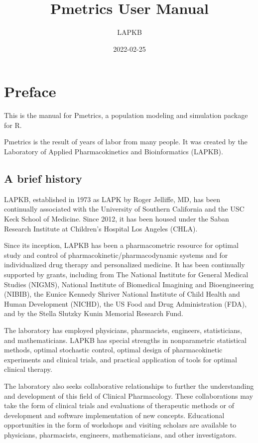 \documentclass[
]{book}
\title{Pmetrics User Manual}
\author{LAPKB}
\date{2022-02-25}
\begin{document}
\maketitle

{
\setcounter{tocdepth}{1}
\tableofcontents
}
\hypertarget{preface}{%
\chapter{Preface}\label{preface}}

This is the manual for Pmetrics, a population modeling and simulation package for R.

Pmetrics is the result of years of labor from many people. It was created by the Laboratory of Applied Pharmacokinetics and Bioinformatics (LAPKB).

\hypertarget{a-brief-history}{%
\section{A brief history}\label{a-brief-history}}

LAPKB, established in 1973 as LAPK by Roger Jelliffe, MD, has been continually associated with the University of Southern California and the USC Keck School of Medicine. Since 2012, it has been housed under the Saban Research Institute at Children's Hospital Los Angeles (CHLA).

Since its inception, LAPKB has been a pharmacometric resource for optimal study and control of pharmacokinetic/pharmacodynamic systems and for individualized drug therapy and personalized medicine. It has been continually supported by grants, including from The National Institute for General Medical Studies (NIGMS), National Institute of Biomedical Imagining and Bioengineering (NIBIB), the Eunice Kennedy Shriver National Institute of Child Health and Human Development (NICHD), the US Food and Drug Administration (FDA), and by the Stella Slutzky Kunin Memorial Research Fund.

The laboratory has employed physicians, pharmacists, engineers, statisticians, and mathematicians. LAPKB has special strengths in nonparametric statistical methods, optimal stochastic control, optimal design of pharmacokinetic experiments and clinical trials, and practical application of tools for optimal clinical therapy.

The laboratory also seeks collaborative relationships to further the understanding and development of this field of Clinical Pharmacology. These collaborations may take the form of clinical trials and evaluations of therapeutic methods or of development and software implementation of new concepts. Educational opportunities in the form of workshops and visiting scholars are available to physicians, pharmacists, engineers, mathematicians, and other investigators.
\end{document}
